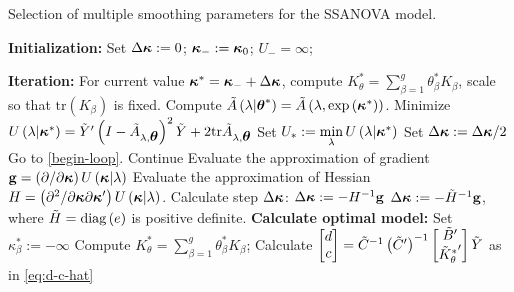 \begin{algorithm}[H]
\caption{Selection of multiple smoothing parameters for the SSANOVA model.}\label{alg:SSANOVA-algorithm}
\begin{algorithmic}[1]
\State \textbf{Initialization:} 
	\State Set $\Delta \mbox{\boldmath $\kappa$} := 0$; \;$\mbox{\boldmath $\kappa$}_{-}:=\mbox{\boldmath $\kappa$}_{0}$; \;$U_- = \infty$;

\State \textbf{Iteration:} 
		\State For current value $\mbox{\boldmath $\kappa$}^* = \mbox{\boldmath $\kappa$}_- + \Delta \mbox{\boldmath $\kappa$}$, compute $K^*_\theta = \sum_{\beta = 1}^g \theta^*_\beta K_\beta$, scale so that $\mbox{tr}\left(K_\beta\right)$ is fixed. \label{begin-loop}
		\State Compute $\tilde{A}\left(\lambda \vert \mbox{\boldmath $\theta$}^* \right) = \tilde{A}\left(\lambda, \exp\left({\mbox{\boldmath $\kappa$}^*} \right)\right)$.
		\State Minimize $U\left(\lambda \vert \mbox{\boldmath $\kappa$}^* \right) =  \tilde{Y}'\left( I - \tilde{A}_{\lambda,\mbox{\boldmath $\theta$}} \right)^2\tilde{Y} + 2\mbox{tr}\tilde{A}_{\lambda,\mbox{\boldmath $\theta$}} $
		\State Set $U_* := \min \limits_\lambda U\left( \lambda \vert \mbox{\boldmath $\kappa$}^* \right) $
		 		\State Set $\Delta \mbox{\boldmath $\kappa$} := \Delta \mbox{\boldmath $\kappa$}/2$
		 		\State Go to \ref{begin-loop}.
		\Else
		\State Continue
		\EndIf
		\State Evaluate the approximation of gradient $\mathbf{g} = \left(\partial /\partial \mbox{\boldmath $\kappa$}\right) U\left(\mbox{\boldmath $\kappa$} \vert \lambda\right)$
		\State Evaluate the approximation of Hessian $H = \left(\partial^2 /\partial \mbox{\boldmath $\kappa$}\partial \mbox{\boldmath $\kappa$}' \right) U\left(\mbox{\boldmath $\kappa$} \vert \lambda\right)$.
		\State Calculate step $\Delta \mbox{\boldmath $\kappa$}$:
				\State $\Delta \mbox{\boldmath $\kappa$} := -H^{-1} \mathbf{g}$
			\Else
				\State $\Delta \mbox{\boldmath $\kappa$} := -\tilde{H}^{-1} \mathbf{g}$, where $\tilde{H} = \textup{diag}\left(e\right)$ is positive definite. \label{ensure-hessian-PD}
			\EndIf
	\EndWhile
\State \textbf{Calculate optimal model:} 
		\State Set $\kappa^*_{\beta} := -\infty$
	\EndIf
	\State Compute $K^*_\theta = \sum_{\beta = 1}^g \theta^*_{\beta} K_\beta$;
	\State Calculate $\begin{bmatrix} d \\ c \end{bmatrix} = \tilde{C}^{-1} \left(\tilde{C}'\right)^{-1} \begin{bmatrix} \tilde{B}' \\ {\tilde{K}^*_\theta}' \end{bmatrix} \tilde{Y}$ as in \eqref{eq:d-c-hat}
	\end{algorithmic}
\end{algorithm}

